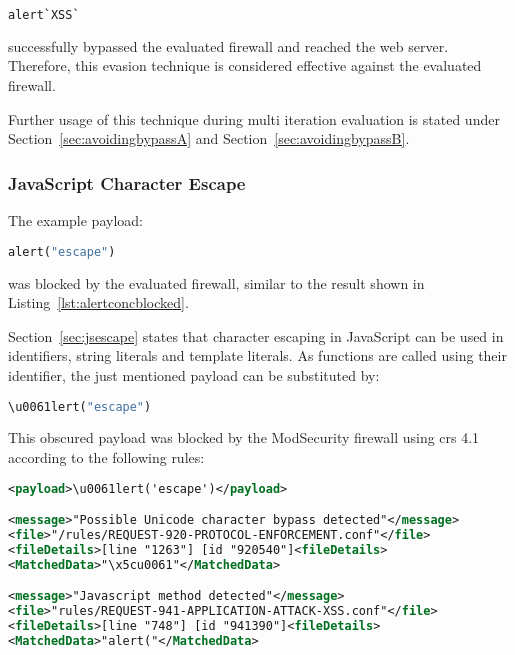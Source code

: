 \begin{lstlisting}[style=basicStyle, language=Python, caption=alert`XSS` bypass, label=lst:alertXSSbypass]
alert`XSS`
\end{lstlisting}

successfully bypassed the evaluated firewall and reached the web server. Therefore, this evasion technique is considered effective against the evaluated firewall.

Further usage of this technique during multi iteration evaluation is stated under Section~\ref{sec:avoidingbypassA} and Section~\ref{sec:avoidingbypassB}.

\subsubsection{JavaScript Character Escape}
\label{sec:jsescapesingleiter}
The example payload:

\begin{lstlisting}[style=basicStyle, language=Python]
alert("escape")
\end{lstlisting}

was blocked by the evaluated firewall, similar to the result shown in Listing~\ref{lst:alertconcblocked}.

%

Section~\ref{sec:jsescape} states that character escaping in JavaScript can be used in identifiers, string literals and template literals.
As functions are called using their identifier, the just mentioned payload can be substituted by:

\begin{lstlisting}[style=basicStyle, language=Python]
\u0061lert("escape")
\end{lstlisting}

This obscured payload was blocked by the ModSecurity firewall using \acrshort{crs} 4.1 according to the following rules:

\begin{lstlisting}[style=ruleStyle, language=XML, caption=\textbackslash u0061lert('escape') blocked]
<payload>\u0061lert('escape')</payload>

<message>"Possible Unicode character bypass detected"</message>
<file>"/rules/REQUEST-920-PROTOCOL-ENFORCEMENT.conf"</file>
<fileDetails>[line "1263"] [id "920540"]<fileDetails>
<MatchedData>"\x5cu0061"</MatchedData>

<message>"Javascript method detected"</message>
<file>"rules/REQUEST-941-APPLICATION-ATTACK-XSS.conf"</file>
<fileDetails>[line "748"] [id "941390"]<fileDetails>
<MatchedData>"alert("</MatchedData>
\end{lstlisting}

